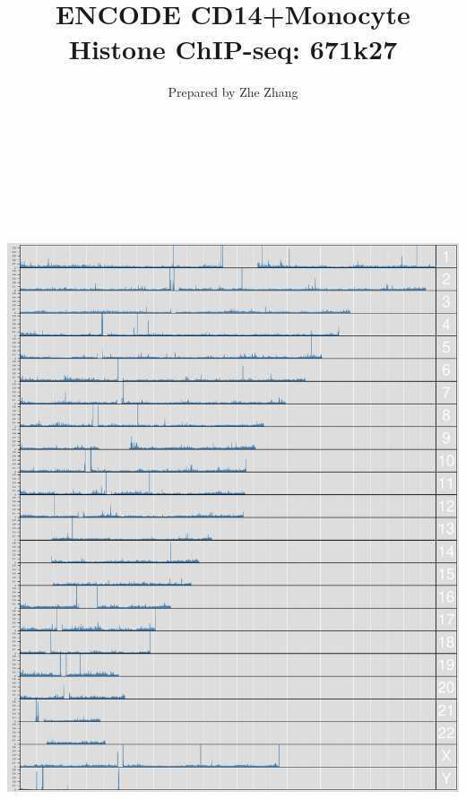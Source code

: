 \documentclass{article}
\begin{document}
\begin{titlepage}
\title{ENCODE CD14+Monocyte Histone ChIP-seq: 671k27}
\author{Prepared by Zhe Zhang}
\maketitle
\tableofcontents
\end{titlepage}




\begin{center}
\includegraphics[width=7in, height=8.5in]{bamchop-landscape}
\end{center}
\pagebreak
\end{document}

